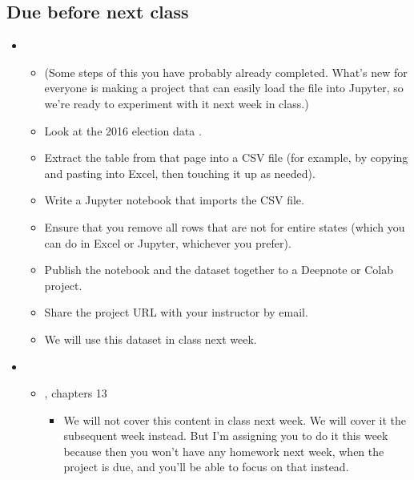 \documentclass[letterpaper,10pt,english]{sphinxmanual}
\begin{document}
\subsection{Due before next class}
\label{\detokenize{course-schedule:id8}}\begin{itemize}
\item {} 
\begin{itemize}
\item {} 
(Some steps of this you have probably already completed.  What’s new for everyone is making a project that can easily load the file into Jupyter, so we’re ready to experiment with it next week in class.)

\item {} 
Look at the 2016 election data .

\item {} 
Extract the table from that page into a CSV file (for example, by copying and pasting into Excel, then touching it up as needed).

\item {} 
Write a Jupyter notebook that imports the CSV file.

\item {} 
Ensure that you remove all rows that are not for entire states (which you can do in Excel or Jupyter, whichever you prefer).

\item {} 
Publish the notebook and the dataset together to a Deepnote or Colab project.

\item {} 
Share the project URL with your instructor by email.

\item {} 
We will use this dataset in class next week.

\end{itemize}

\item {} 
\begin{itemize}
\item {} 
, chapters 1\sphinxhyphen{}3
\begin{itemize}
\item {} 
 We will not cover this content in class next week.  We will cover it the subsequent week instead.  But I’m assigning you to do it this week because then you won’t have any homework next week, when the project is due, and you’ll be able to focus on that instead.


\end{itemize}
\end{itemize}
\end{itemize}
\end{document}
